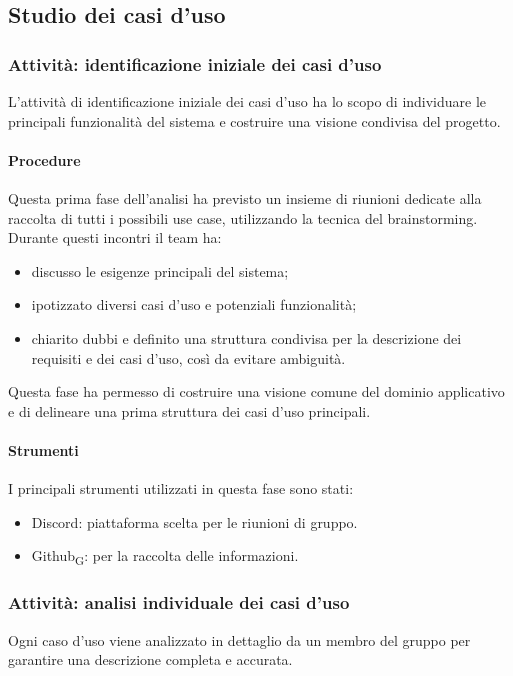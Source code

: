 \documentclass[11pt,a4paper]{article}
\newcommand{\gls}[1]{#1\textsubscript{G}}
\begin{document}
\subsection{Studio dei casi d'uso}

\subsubsection{Attività: identificazione iniziale dei casi d'uso}
L’attività di identificazione iniziale dei casi d’uso ha lo scopo di individuare le principali funzionalità del sistema e costruire una visione condivisa del progetto.

\paragraph{Procedure}
Questa prima fase dell’analisi ha previsto un insieme di riunioni dedicate alla raccolta di tutti i possibili use case, utilizzando la tecnica del brainstorming. Durante questi incontri il team ha:
\begin{itemize}
\item discusso le esigenze principali del sistema;
\item ipotizzato diversi casi d’uso e potenziali funzionalità;
\item chiarito dubbi e definito una struttura condivisa per la descrizione dei requisiti e dei casi d’uso, così da evitare ambiguità.
\end{itemize}
Questa fase ha permesso di costruire una visione comune del dominio applicativo e di delineare una prima struttura dei casi d’uso principali.

\paragraph{Strumenti}
I principali strumenti utilizzati in questa fase sono stati:
\begin{itemize}
\item Discord: piattaforma scelta per le riunioni di gruppo.
\item \gls{Github}: per la raccolta delle informazioni.
\end{itemize}

\subsubsection{Attività: analisi individuale dei casi d'uso}
Ogni caso d’uso viene analizzato in dettaglio da un membro del gruppo per garantire una descrizione completa e accurata.
\end{document}
